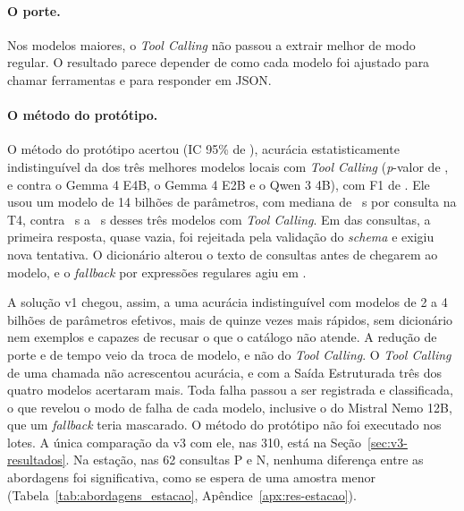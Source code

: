 \paragraph{O porte.} Nos modelos maiores, o \textit{Tool Calling} não passou a extrair melhor de modo regular. O resultado parece depender de como cada modelo foi ajustado para chamar ferramentas e para responder em JSON.

\paragraph{O método do protótipo.} O método do protótipo acertou  (IC 95\% de ), acurácia estatisticamente indistinguível da dos três melhores modelos locais com \textit{Tool Calling} (\textit{p}-valor de ,  e  contra o Gemma 4 E4B, o Gemma 4 E2B e o Qwen 3 4B), com F1 de . Ele usou um modelo de 14 bilhões de parâmetros, com mediana de ~s por consulta na T4, contra ~s a ~s desses três modelos com \textit{Tool Calling}. Em  das  consultas, a primeira resposta, quase vazia, foi rejeitada pela validação do \textit{schema} e exigiu nova tentativa. O dicionário alterou o texto de  consultas antes de chegarem ao modelo, e o \textit{fallback} por expressões regulares agiu em .

A solução v1 chegou, assim, a uma acurácia indistinguível com modelos de 2 a 4 bilhões de parâmetros efetivos, mais de quinze vezes mais rápidos, sem dicionário nem exemplos e capazes de recusar o que o catálogo não atende. A redução de porte e de tempo veio da troca de modelo, e não do \textit{Tool Calling}. O \textit{Tool Calling} de uma chamada não acrescentou acurácia, e com a Saída Estruturada três dos quatro modelos acertaram mais. Toda falha passou a ser registrada e classificada, o que revelou o modo de falha de cada modelo, inclusive o do Mistral Nemo 12B, que um \textit{fallback} teria mascarado. O método do protótipo não foi executado nos lotes. A única comparação da v3 com ele, nas 310, está na Seção~\ref{sec:v3-resultados}. Na estação, nas 62 consultas P e N, nenhuma diferença entre as abordagens foi significativa, como se espera de uma amostra menor (Tabela~\ref{tab:abordagens_estacao}, Apêndice~\ref{apx:res-estacao}).

